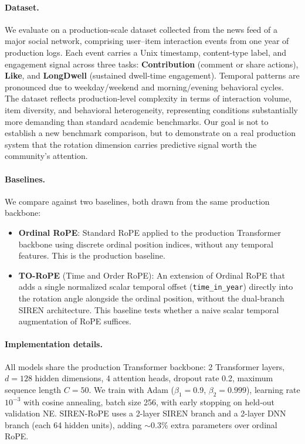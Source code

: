 \documentclass{article}
\begin{document}
\paragraph{Dataset.}
We evaluate on a production-scale dataset collected from the news feed of a
major social network, comprising user--item interaction events from one year
of production logs. Each event carries a Unix timestamp, content-type label,
and engagement signal across three tasks: \textbf{Contribution} (comment or
share actions), \textbf{Like}, and \textbf{LongDwell} (sustained dwell-time
engagement). Temporal patterns are pronounced due to weekday/weekend and
morning/evening behavioral cycles. The dataset reflects production-level
complexity in terms of interaction volume, item diversity, and behavioral
heterogeneity, representing conditions substantially more demanding than
standard academic benchmarks. Our goal is not to establish a new benchmark
comparison, but to demonstrate on a real production system that the rotation
dimension carries predictive signal worth the community's attention.

\paragraph{Baselines.}
We compare against two baselines, both drawn from the same production
backbone:
\begin{itemize}
  \item \textbf{Ordinal RoPE}: Standard RoPE applied to the production
    Transformer backbone using discrete ordinal position indices, without any
    temporal features. This is the production baseline.
  \item \textbf{TO-RoPE} (Time and Order RoPE): An extension of Ordinal RoPE
    that adds a single normalized scalar temporal offset (\texttt{time\_in\_year})
    directly into the rotation angle alongside the ordinal position, without the
    dual-branch SIREN architecture. This baseline tests whether a naive scalar
    temporal augmentation of RoPE suffices.
\end{itemize}

\paragraph{Implementation details.}
All models share the production Transformer backbone: 2 Transformer layers,
$d = 128$ hidden dimensions, 4 attention heads, dropout rate 0.2, maximum
sequence length $C = 50$. We train with Adam ($\beta_1 = 0.9$,
$\beta_2 = 0.999$), learning rate $10^{-3}$ with cosine annealing, batch
size 256, with early stopping on held-out validation NE. SIREN-RoPE uses a
2-layer SIREN branch and a 2-layer DNN branch (each 64 hidden units),
adding $\sim$0.3\% extra parameters over ordinal RoPE.
\end{document}
